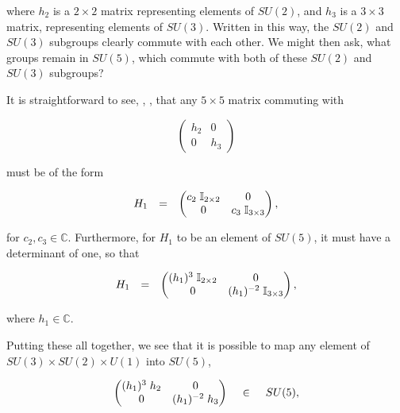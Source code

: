 \documentclass[letterpaper,12pt,titlepage,oneside,final]{book}
\newcommand{\C}{\mathbb{C}}
\begin{document}
\noindent where $h_2$ is a $2\times2$ matrix representing elements of $SU(2)$, and $h_3$ is a $3\times3$ matrix, representing elements of $SU(3)$.   Written in this way, the $SU(2)$ and $SU(3)$ subgroups clearly commute with each other.  We might then ask, what groups remain in $SU(5)$, which commute with both of these $SU(2)$ and $SU(3)$ subgroups?  

It is straightforward to see, \cite{agut}, \cite{Robinson}, that any $5\times 5$ matrix commuting with 

$$ \left( \begin{matrix}h_2&0\\0&h_3 \end{matrix}  \right)
$$

\noindent must be of the form 

\begin{equation}\begin{array}{ccc}\label{u1}
H_1 & = &   \left( \begin{matrix}c_2\hspace{1mm} \mathbb{I}_{2\times2}&0\\0&c_3\hspace{1mm} \mathbb{I}_{3\times 3} \end{matrix}  \right),
\end{array}\end{equation}

\noindent for $c_2, c_3\in\C$.  Furthermore, for $H_1$ to be an element of $SU(5)$, it must have a determinant of one, so that

\begin{equation}\begin{array}{ccc}\label{u1}
H_1 & = &   \left( \begin{matrix}(h_1)^{3}\hspace{1mm} \mathbb{I}_{2\times2}&0\\0&(h_1)^{-2}\hspace{1mm} \mathbb{I}_{3\times 3} \end{matrix}  \right),
\end{array}\end{equation}

\noindent where $h_1\in\mathbb{C}$.  




Putting these all together, we see that it is possible to map any element of $SU(3)\times SU(2) \times U(1)$ into $SU(5)$,

\begin{equation}
   \left( \begin{matrix}(h_1)^3\hspace{1mm} h_2&0\\0&(h_1)^{-2}\hspace{1mm}h_3 \end{matrix}  \right) \hspace{4mm}\in \hspace{4mm} SU(5),
\end{equation}
\end{document}

